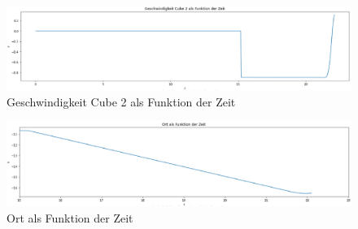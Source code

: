 \documentclass[../main.tex]{subfiles}
\begin{document}
    \begin{figure}[H]
        \begin{center}
            \centerline{\includegraphics[width=155mm]{./images/Inelastisch/GeschwindigkeitCube2AlsFunktionDerZeit}}
            \caption{Geschwindigkeit Cube 2 als Funktion der Zeit}
            \label{fig:GeschwindigkeitCube2AlsFunktionDerZeit}
        \end{center}
    \end{figure}

    \begin{figure}[H]
        \begin{center}
            \centerline{\includegraphics[width=155mm]{./images/Inelastisch/OrtAlsFunktionDerZeit}}
            \caption{Ort als Funktion der Zeit}
            \label{fig:OrtAlsFunktionDerZeitInelastisch}
        \end{center}
    \end{figure}
\end{document}
